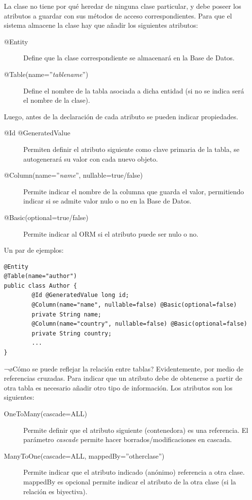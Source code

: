 \documentclass[11pt]{article}
\begin{document}
La clase no tiene por qué heredar de ninguna clase particular, y debe poseer los atributos a guardar
con sus métodos de acceso correspondientes. Para que el sistema almacene la clase hay que añadir los
siguientes atributos:




\begin{description}
\item[@Entity] Define que la clase correspondiente se almacenará en la Base de Datos.
\item[@Table(name=''\emph{tablename}'')] Define el nombre de la tabla asociada a dicha entidad (si no se indica
  será el nombre de la clase).
\end{description}


Luego, antes de la declaración de cada atributo se pueden indicar propiedades.




\begin{description}
\item[@Id @GeneratedValue] Permiten definir el atributo siguiente como clave primaria de la tabla, se
     autogenerará su valor con cada nuevo objeto.
\item[@Column(name=''\emph{name}'', nullable=true/false)] Permite indicar el nombre de la columna que
     guarda el valor, permitiendo indicar si se admite valor nulo o no en la Base de Datos.
\item[@Basic(optional=true/false)] Permite indicar al ORM si el atributo puede ser nulo o no.
\end{description}


Un par de ejemplos:


\begin{lstlisting}
@Entity
@Table(name="author")
public class Author {
        @Id @GeneratedValue long id;
        @Column(name="name", nullable=false) @Basic(optional=false)
        private String name;
        @Column(name="country", nullable=false) @Basic(optional=false)
        private String country;
        ...
}
\end{lstlisting}




¬øCómo se puede reflejar la relación entre tablas? Evidentemente, por medio de referencias cruzadas. Para
indicar que un atributo debe de obtenerse a partir de otra tabla es necesario añadir otro tipo de información. 
Los atributos son los siguientes:




\begin{description}
\item[OneToMany(cascade=ALL)] Permite definir que el atributo siguiente (contenedora) es una
     referencia. El parámetro \emph{cascade} permite hacer borrados/modificaciones en cascada.
\item[ManyToOne(cascade=ALL, mappedBy=''otherclase'')] Permite indicar que el atributo indicado
     (anónimo) referencia a otra clase. mappedBy es opcional permite indicar el atributo de la otra
     clase (si la relación es biyectiva).
\end{description}
\end{document}
